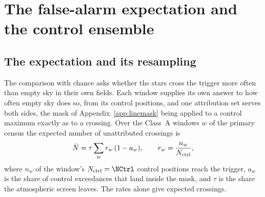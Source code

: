 \section{The false-alarm expectation and the control ensemble}
\label{app:falsealarm}

\subsection{The expectation and its resampling}

The comparison with chance asks whether the stars cross the trigger more
often than empty sky in their own fields. Each window supplies
its own answer to how often empty sky does so, from its control positions,
and one attribution set serves both sides, the mask of
Appendix~\ref{app:linemask} being applied to a control maximum exactly as to
a crossing. Over the \CeNWin{} Class~A windows $w$ of the primary census the
expected number of unattributed crossings is
\begin{equation*}
\bar N=\tau\sum_{w}r_w\,(1-a_w),\qquad r_w=\frac{n_w}{N_{\rm ctrl}},
\end{equation*}
where $n_w$ of the window's $N_{\rm ctrl}=\NCtrl$ control positions reach the
trigger, $a_w$ is the share of control exceedances that land inside the
mask, and $\tau$ is the share the atmospheric screen leaves. The rates alone
give \CeExpTrig{} expected crossings.

